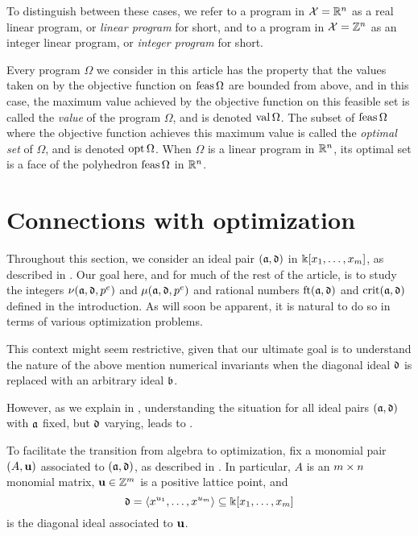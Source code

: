 \documentclass[11pt]{amsart}
\begin{document}
To distinguish between these cases, we refer to a program in $\mathcal{X} = \mathbb{R}^n$ as a {real linear program}, or \emph{linear program} for short, and to a program in $\mathcal{X}=\mathbb{Z}^n$ as an {integer linear program}, or \emph{integer program} for short.

Every program $\Omega$ we consider in this article has the property that the values taken on by the objective function on $\operatorname{feas} \Omega$ are bounded from above, and in this case, the maximum value achieved by the objective function on this feasible set is called the \emph{value} of the program $\Omega$, and is denoted $\operatorname{val} \Omega$.  The subset of $\operatorname{feas} \Omega$ where the objective function achieves this maximum value is called the \emph{optimal set} of $\Omega$, and is denoted $\operatorname{opt} \Omega$.   When $\Omega$ is a linear program in $\mathbb{R}^n$, its optimal set is a face of the polyhedron $\operatorname{feas} \Omega$ in $\mathbb{R}^n$.


\newpage
\section{Connections with optimization}
\label{sec: LPs}
  
Throughout this section, we consider an ideal pair $(\mathfrak{a}, \mathfrak{d})$ in $\Bbbk[x_1, \ldots, x_{m}]$, as described in .   Our goal here, and for much of the rest of the article, is to study the integers $\nu(\mathfrak{a}, \mathfrak{d}, p^e)$ and $\mu(\mathfrak{a}, \mathfrak{d}, p^e)$ and rational numbers $\operatorname{ft}(\mathfrak{a}, \mathfrak{d})$ and $\operatorname{crit}(\mathfrak{a}, \mathfrak{d})$ defined in the introduction.  As will soon be apparent, it is natural to do so in terms of various optimization problems.

\begin{remark} \label{reduction to diagonal :R}
This context might seem restrictive, given that our ultimate goal is to understand the nature of the above mention numerical invariants when the diagonal ideal $\mathfrak{d}$ is replaced with an arbitrary ideal $\mathfrak{b}$.  

However, as we explain in , understanding the situation for all ideal pairs $(\mathfrak{a}, \mathfrak{d})$ with $\mathfrak{a}$ fixed, but $\mathfrak{d}$ varying, leads to .
\end{remark}

To facilitate the transition from algebra to optimization, fix a monomial pair $(A, \mathbf{u})$ associated to $(\mathfrak{a}, \mathfrak{d})$, as described in .  In particular, $A$ is an $m \times n$ monomial matrix, $\mathbf{u} \in \mathbb{Z}^m$ is a positive lattice point, and 
\[ \mathfrak{d} = \langle x^{u_1}, \ldots, x^{u_{m}} \rangle \subseteq \Bbbk[x_1, \ldots, x_{m}] \] is the diagonal ideal associated to $\mathbf{u}$.
\end{document}
